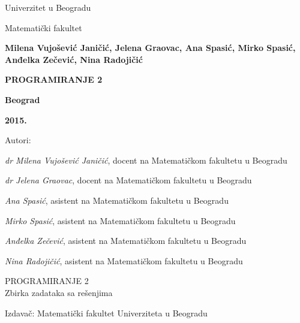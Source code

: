 \pagestyle{empty}

\begin{center}
{\sffamily

{\fontsize{16pt}{19pt}\selectfont Univerzitet u Beogradu}

{\fontsize{16pt}{19pt}\selectfont Matematički fakultet}
\vspace{70pt}

{\fontsize{16pt}{19pt}\selectfont \bfseries  Milena Vujošević Janičić, Jelena Graovac, Ana Spasić, Mirko Spasić, Anđelka Zečević, Nina Radojičić}

\vspace{50pt}
\centerline{{\huge\bfseries PROGRAMIRANJE 2}}
\centerline{{\huge\bfseries {\fontsize{22pt}{26pt}\selectfont {Zbirka zadataka sa rešenjima}}}}


\vspace{120pt}

\centerline{{\Large \bfseries Beograd}}
\centerline{{\Large \bfseries 2015.}}

}
\end{center}



\newpage
\normalsize

\noindent
Autori: 

\noindent
{\slshape dr Milena Vujošević Janičić}, docent na Matematičkom fakultetu u Beogradu

\noindent
{\slshape dr Jelena Graovac}, docent na Matematičkom fakultetu u Beogradu

\noindent
{\slshape Ana Spasić}, asistent na Matematičkom fakultetu u Beogradu

\noindent
{\slshape Mirko Spasić}, asistent na Matematičkom fakultetu u Beogradu

\noindent
{\slshape Anđelka Zečević}, asistent na Matematičkom fakultetu u Beogradu

\noindent
{\slshape Nina Radojičić}, asistent na Matematičkom fakultetu u Beogradu
\vspace*{2mm}

\noindent
PROGRAMIRANJE 2\\
Zbirka zadataka sa rešenjima
\vspace*{3mm}


\noindent
Izdava\v{c}: Matematički fakultet Univerziteta u Beogradu

